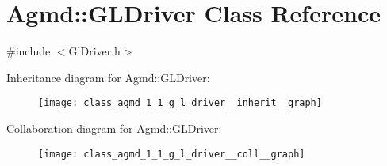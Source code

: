 \hypertarget{class_agmd_1_1_g_l_driver}{\section{Agmd\+:\+:G\+L\+Driver Class Reference}
\label{class_agmd_1_1_g_l_driver}
}


{\ttfamily \#include $<$Gl\+Driver.\+h$>$}



Inheritance diagram for Agmd\+:\+:G\+L\+Driver\+:\nopagebreak
\begin{figure}[H]
\begin{center}
\leavevmode
\texttt{[image: class\_agmd\_1\_1\_g\_l\_driver\_\_inherit\_\_graph]}
\end{center}
\end{figure}


Collaboration diagram for Agmd\+:\+:G\+L\+Driver\+:\nopagebreak
\begin{figure}[H]
\begin{center}
\leavevmode
\texttt{[image: class\_agmd\_1\_1\_g\_l\_driver\_\_coll\_\_graph]}
\end{center}
\end{figure}
